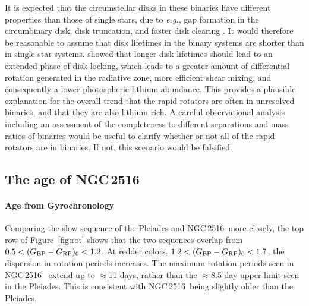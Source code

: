 \documentclass[12pt,twocolumn,tighten]{aastex63}
\newcommand{\cn}{NGC\,2516} %
\newcommand{\bpmrpo}{(G_{\rm BP}-G_{\rm RP})_0}
\begin{document}
It is expected that the circumstellar disks in these binaries have
different properties than those of single stars, due to {\it e.g.}, gap
formation in the circumbinary disk, disk truncation, and faster disk
clearing \citep{artymowicz_dynamics_1994,moe_impact_2020}.  It would
therefore be reasonable to assume that disk lifetimes in the binary
systems are shorter than in single star systems.
\citet{eggenberger_impact_2012} showed that longer disk lifetimes
should lead to an extended phase of disk-locking, which leads to a
greater amount of differential rotation generated in the radiative
zone, more efficient shear mixing, and consequently a lower photospheric
lithium abundance.  This provides a plausible explanation for the
overall trend that the rapid rotators are often in unresolved
binaries, and that they are also lithium rich.  A careful
observational analysis including an assessment of the completeness to
different separations and mass ratios of binaries would be useful to
clarify whether or not all of the rapid rotators are in binaries.  If
not, this scenario would be falsified.


\subsection{The age of NGC\,2516}
\label{disc:absage}


\paragraph{Age from Gyrochronology}
Comparing the slow sequence of the Pleiades and \cn\ more closely, the
top row of Figure~\ref{fig:rot} shows that the two sequences overlap
from $0.5<\bpmrpo<1.2$.  At redder colors, $1.2<\bpmrpo<1.7$, the
dispersion in rotation periods increases.  The maximum rotation
periods seen in \cn\ 
extend up to $\approx$11 days, rather than the $\approx$8.5 day upper
limit seen in the Pleiades.  This is consistent with \cn\ being
slightly older than the Pleiades.
\end{document}
